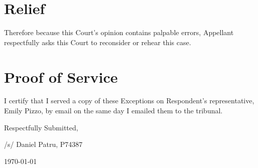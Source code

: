 \documentclass[12pt,\documentclassflag]{michiganCourtOfAppealsBrief}
\begin{document}
\section{Relief}

Therefore because this Court's opinion contains palpable errors, Appellant respectfully asks this Court to reconsider or rehear this case.


\section{Proof of Service}

I certify that I served a copy of these Exceptions on Respondent's representative, Emily Pizzo, by email on the same day I emailed them to the tribunal.

\vspace{1\baselineskip}

{ \setlength{\leftskip}{3.5in}

  Respectfully Submitted,

  /s/ Daniel Patru, P74387

\today

  \setlength{\leftskip}{0pt}}


\newpage\empty%
\end{document}
